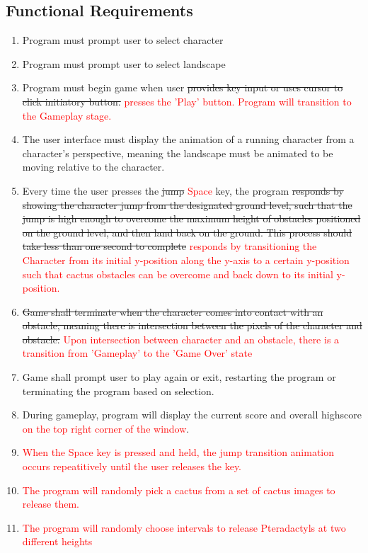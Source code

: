 \documentclass[12pt, titlepage]{article}
\begin{document}
\subsection{Functional Requirements}
\begin{enumerate}
\item Program must prompt user to select character
\item	Program must prompt user to select landscape
\item	Program must begin game when user \sout{provides key input or uses cursor to click initiatory button.} \textcolor{red}{presses the 'Play' button. Program will transition to the Gameplay stage.}
\item	The user interface must display the animation of a running character from a character’s perspective, meaning the landscape must be animated to be moving relative to the character.
\item	Every time the user presses the \sout{jump} \textcolor{red}{Space} key, the program \sout{responds by showing the character jump from the designated ground level, such that the jump is high enough to overcome the maximum height of obstacles positioned on the ground level, and then land back on the ground. This process should take less than one second to complete} \textcolor{red}{responds by transitioning the Character from its initial y-position along the y-axis to a certain y-position such that cactus obstacles can be overcome and back down to its initial y-position.}
\item	\sout{Game shall terminate when the character comes into contact with an obstacle, meaning there is intersection between the pixels of the character and obstacle.} \textcolor{red}{Upon intersection between character and an obstacle, there is a transition from 'Gameplay' to the 'Game Over' state}
\item	Game shall prompt user to play again or exit, restarting the program or terminating the program based on selection.
\item  During gameplay, program will display the current score and overall highscore \textcolor{red}{on the top right corner of the window}.
\item{\textcolor{red}{When the Space key is pressed and held, the jump transition animation occurs repeatitively until the user releases the key.}}
\item{\textcolor{red}{The program will randomly pick a cactus from a set of cactus images to release them.}}
\item{\textcolor{red}{The program will randomly choose intervals to release Pteradactyls at two different heights}}

\end{enumerate}
\end{document}
